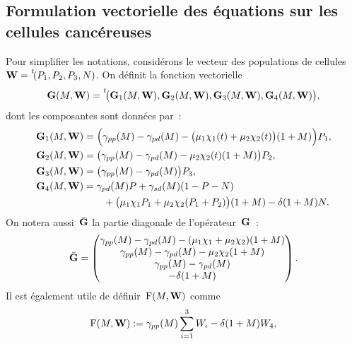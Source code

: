 \documentclass[main.tex]{subfiles}
\begin{document}
\subsection{Formulation vectorielle des équations sur les cellules cancéreuses}

Pour simplifier les notations, considérons le vecteur des populations de cellules~${\bf W}=\prescript{\mathit{t\!}}{}{(P_1, P_2, P_3, N)}$. On définit la fonction vectorielle 
\begin{equation}
{\bf G}(M,{\bf W}) = \prescript{\mathit{t\!}}{}{\big({\bf G}_1(M,{\bf W}), {\bf G}_2(M,{\bf W}), {\bf G}_3(M,{\bf W}), {\bf G}_4(M,{\bf W}) \big)},
\end{equation}
dont les composantes sont données par~:
\begin{align}
{\bf G}_1(M,{\bf W}) &= \Big(\gamma_{pp}(M)- \gamma_{pd}(M) - \big(\mu_1 \chi_1 (t)+\mu_2 \chi_2(t) \big)(1+M)\Big) P_1, \\
{\bf G}_2(M,{\bf W}) &= \big(\gamma_{pp}(M)- \gamma_{pd}(M) - \mu_2 \chi_2(t) (1+M)\big)P_2, \\
{\bf G}_3(M,{\bf W}) &= \big(\gamma_{pp}(M) - \gamma_{pd}(M) \big)P_3, \\
{\bf G}_4(M,{\bf W}) &= \gamma_{pd}(M) P +\gamma_{sd}(M) (1-P-N)  \nonumber \\
&\qquad +\big( \mu_1 \chi_1 P_1 + \mu_2\chi_2 (P_1+P_2) \big) (1+M) - \delta(1+M)N.
\end{align}
On notera aussi~$\bar{{\bf G}}$ la partie diagonale de l'opérateur~${\bf G}$~:
\begin{equation}\label{eq:GG_bar}
\bar{{\bf G}} = \begin{pmatrix}
\gamma_{pp}(M)- \gamma_{pd}(M) - (\mu_1 \chi_1 +\mu_2 \chi_2 )(1+M) \\
\gamma_{pp}(M)- \gamma_{pd}(M) - \mu_2 \chi_2 (1+M) \\
\gamma_{pp}(M) - \gamma_{pd}(M) \\
- \delta(1+M)
\end{pmatrix}.
\end{equation}
Il est également utile de définir~${\rm F}(M,{\bf W})$ comme
\begin{align}
  \label{eq_F}
  {\rm F}(M,{\bf W}):=\gamma_{pp}(M)\sum_{i=1}^3W_i-\delta(1+M)W_4,
\end{align}
\end{document}
